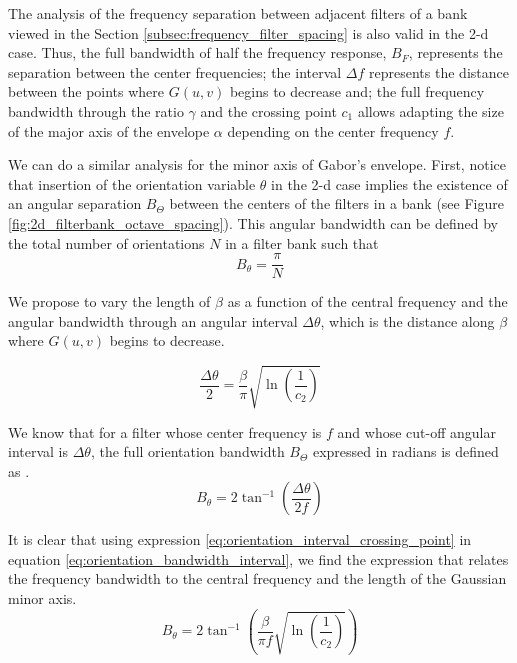 The analysis of the frequency separation between adjacent filters of a bank viewed in the Section \ref{subsec:frequency_filter_spacing} is also valid in the 2-d case. Thus, the full bandwidth of half the frequency response, $B_F$, represents the separation between the center frequencies; the interval $\Delta f$ represents the distance between the points where $G(u, v)$ begins to decrease and; the full frequency bandwidth through the ratio $\gamma$ and the crossing point $c_1$ allows adapting the size of the major axis of the envelope $\alpha$ depending on the center frequency $f$.

We can do a similar analysis for the minor axis of Gabor's envelope. First, notice that insertion of the orientation variable $\theta$ in the 2-d case implies the existence of an angular separation $B_{\Theta}$ between the centers of the filters in a bank (see Figure \ref{fig:2d_filterbank_octave_spacing}). This angular bandwidth can be defined by the total number of orientations $N$ in a filter bank such that
\begin{equation}\label{eq:angular_bandwidth}
    B_{\theta} = \frac{\pi}{N}
\end{equation}

We propose to vary the length of $\beta$ as a function of the central frequency and the angular bandwidth through an angular interval $\Delta \theta$, which is the distance along $\beta$ where $G(u, v)$ begins to decrease.

\begin{equation}\label{eq:orientation_interval_crossing_point}
    \frac{\Delta \theta}{2} = \frac{\beta}{\pi}\sqrt{\ln \left(\frac{1}{c_2}\right)}
\end{equation}

We know that for a filter whose center frequency is $f$ and whose cut-off angular interval is $\Delta \theta$, the full orientation bandwidth $B_\Theta$ expressed in radians is defined as \citep{Daugman:JOSA:1985a}.
\begin{equation}\label{eq:orientation_bandwidth_interval}
    B_{\theta} = 2 \tan^{-1} \left( \frac{\Delta \theta}{2f} \right)
\end{equation}

It is clear that using expression \eqref{eq:orientation_interval_crossing_point} in equation \eqref{eq:orientation_bandwidth_interval}, we find the expression that relates the frequency bandwidth to the central frequency and the length of the Gaussian minor axis.
\begin{equation}\label{eq:orientation_bandwidth}
    B_{\theta} = 2 \tan^{-1} \left( \frac{\beta}{\pi f} \sqrt{\ln \left(\frac{1}{c_2}\right)} \right)
\end{equation}

